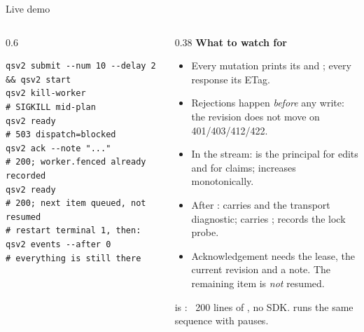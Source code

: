 \begin{frame}[fragile]{Live demo}
\begin{columns}[T]
\begin{column}{0.6\textwidth}
\begin{lstlisting}[style=http, basicstyle=\ttfamily\tiny, breaklines=false]
qsv2 submit --num 10 --delay 2 && qsv2 start
qsv2 kill-worker                        # SIGKILL mid-plan
qsv2 ready                              # 503 dispatch=blocked
qsv2 ack --note "..."                   # 200; worker.fenced already recorded
qsv2 ready                              # 200; next item queued, not resumed
# restart terminal 1, then:
qsv2 events --after 0                   # everything is still there
\end{lstlisting}
        \end{column}
        \begin{column}{0.38\textwidth}
            \footnotesize
            \textbf{What to watch for}
            \begin{itemize}
                \item Every mutation prints its  and ; every response its ETag.
                \item Rejections happen \emph{before} any write: the revision does not move on 401/403/412/422.
                \item In the stream:  is the principal for edits and  for claims;
                       increases monotonically.
                \item After :  carries
                       and the transport diagnostic;
                       carries ;
                       records the lock probe.
                \item Acknowledgement needs the lease, the current revision and a note. The remaining item is
                      \emph{not} resumed.
            \end{itemize}
            \vspace{0.2cm}
            {\color{qsgray}\footnotesize {} is : ~200 lines of , no SDK.
             runs the same sequence with pauses.\par}
        \end{column}
    \end{columns}
\end{frame}
